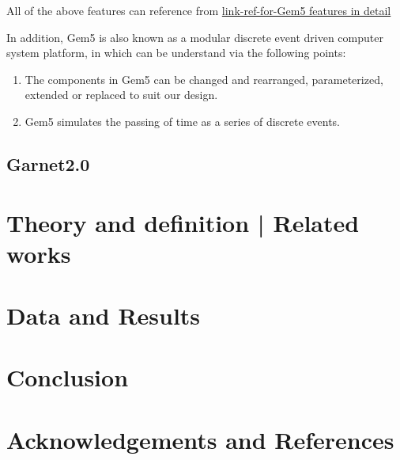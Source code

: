 \documentclass[13pt]{article}
\begin{document}
	All of the above features can reference from \href{http://gem5.org/Main_Page}{link-ref-for-Gem5 features in detail}
	
	In addition, Gem5 is also known as a modular discrete event driven computer system platform, in which can be understand via the following points:
	\begin{enumerate}
		\item The components in Gem5 can be changed and rearranged, parameterized, extended or replaced to suit our design.
		\item Gem5 simulates the passing of time as a series of discrete events.
		
	\end{enumerate}
	
\subsection{Garnet2.0}
	

	
\section{Theory and definition | Related works}

\section{Data and Results}

\section{Conclusion}

\section*{Acknowledgements and References}


	\newpage
	
	
	
\end{document}
